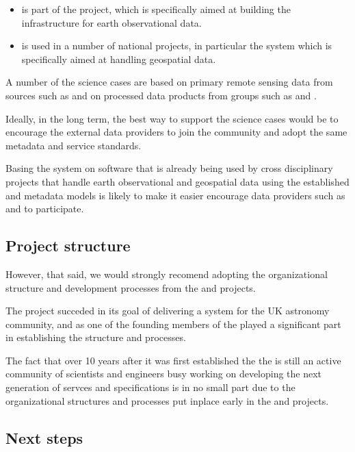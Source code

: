 \documentclass{article}
\begin{document}
\begin{itemize}
    \item \cite{metacat} is part of the \cite{data-one} project, which is
    specifically aimed at building the infrastructure for earth observational
    data.
    \item \cite{ckan} is used in a number of national \cite{data-gov}
    projects, in particular the \cite{fgdc} \cite{fgdc-geo} system which
    is specifically aimed at handling geospatial data.
\end{itemize}

A number of the \cite{trop} science cases are based on primary remote
sensing data from sources such as \cite{landsat} and on processed data
products from groups such as \cite{nasa-jpl-carbon} and \cite{whrc}.

Ideally, in the long term, the best way to support the \cite{trop}
science cases would be to encourage the external data providers to join
the \cite{trop} community and adopt the same metadata and service standards.
 
Basing the \cite{trop} system on software that is already being used by cross
disciplinary projects that handle earth observational and geospatial data
using the established \cite{gis} and \cite{eml} metadata models is likely
to make it easier encourage data providers such as \cite{nasa-jpl-carbon}
and \cite{whrc} to participate.

\subsection{Project structure}

However, that said, we would strongly recomend adopting the organizational
structure and development processes from the \cite{ivoa} and \cite{astro}
projects.


The \cite{astro} project succeded in its goal of delivering a \cite{vo}
system for the UK astronomy community, and as one of the founding members
of the \cite{ivoa} played a significant part in establishing the \cite{ivoa}
structure and processes.

The fact that over 10 years after it was first established the the \cite{ivoa}
is still an active community of scientists and engineers busy working on
developing the next generation of servces and specifications is in no small
part due to the organizational structures and processes put inplace early
in the \cite{astro} and \cite{ivoa} projects.


\subsection{Next steps}
\end{document}
